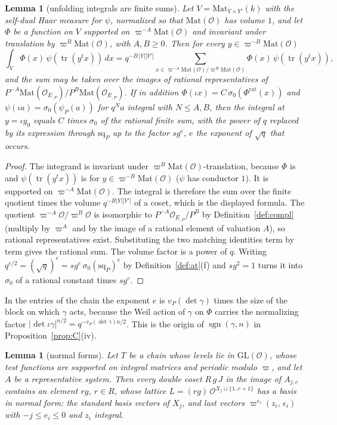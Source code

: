 \documentclass[11pt]{article}
\newcommand{\OEr}{\mathcal O_E}
\newcommand{\Ok}{\mathcal O}
\newcommand{\GL}{\mathrm{GL}}
\newcommand{\Mat}{\mathrm{Mat}}
\newcommand{\sgn}{\operatorname{sgn}}
\newtheorem{lemma}[theorem]{Lemma}
\theoremstyle{definition}
\theoremstyle{remark}
\begin{document}
\begin{lemma}[unfolding integrals are finite sums]\label{lem:C3}
Let $V=\Mat_{Y\times Y'}(k)$ with the self-dual Haar measure for $\psi$, normalized so that $\Mat(\Ok)$ has volume $1$, and let $\Phi$ be a function on $V$ supported on $\varpi^{-A}\Mat(\Ok)$ and invariant under translation by $\varpi^{B}\Mat(\Ok)$, with $A,B\ge0$. Then for every $y\in\varpi^{-B}\Mat(\Ok)$
\[
\int_V\Phi(x)\,\psi(\operatorname{tr}(y^{t}x))\,dx=q^{-B\,|Y||Y'|}\sum_{x\in\varpi^{-A}\Mat(\Ok)/\varpi^{B}\Mat(\Ok)}\Phi(x)\,\psi(\operatorname{tr}(y^{t}x)),
\]
and the sum may be taken over the images of rational representatives of $P^{-A}\Mat(\OEr_{,P})/P^{B}\Mat(\OEr_{,P})$. If in addition $\Phi(\iota x)=C\,\sigma_0(\Phi^{\mathrm{rat}}(x))$ and $\psi(\iota a)=\sigma_0(\psi_P(a))$ for $q^{N}a$ integral with $N\le A,B$, then the integral at $y=\iota y_0$ equals $C$ times $\sigma_0$ of the rational finite sum, with the power of $q$ replaced by its expression through $\mathrm{sq}_P$ up to the factor $sg^{e}$, $e$ the exponent of $\sqrt q$ that occurs.
\end{lemma}

\begin{proof}
The integrand is invariant under $\varpi^{B}\Mat(\Ok)$-translation, because $\Phi$ is and $\psi(\operatorname{tr}(y^{t}x))$ is for $y\in\varpi^{-B}\Mat(\Ok)$ ($\psi$ has conductor $1$). It is supported on $\varpi^{-A}\Mat(\Ok)$. The integral is therefore the sum over the finite quotient times the volume $q^{-B|Y||Y'|}$ of a coset, which is the displayed formula. The quotient $\varpi^{-A}\Ok/\varpi^{B}\Ok$ is isomorphic to $P^{-A}\OEr_{,P}/P^{B}$ by Definition~\ref{def:compl} (multiply by $\varpi^{A}$ and by the image of a rational element of valuation $A$), so rational representatives exist. Substituting the two matching identities term by term gives the rational sum. The volume factor is a power of $q$. Writing $q^{e/2}=(\sqrt q)^{e}=sg^{e}\,\sigma_0(\mathrm{sq}_P)^{e}$ by Definition~\ref{def:at}(f) and $sg^2=1$ turns it into $\sigma_0$ of a rational constant times $sg^{e}$.
\end{proof}

In the entries of the chain the exponent $e$ is $v_P(\det\gamma)$ times the size of the block on which $\gamma$ acts, because the Weil action of $\gamma$ on $\Phi$ carries the normalizing factor $\lvert\det\iota\gamma\rvert^{n/2}=q^{-v_P(\det\gamma)n/2}$. This is the origin of $\sgn(\gamma,n)$ in Proposition~\ref{prop:C}(iv).

\begin{lemma}[normal forms]\label{lem:C4}
Let $T$ be a chain whose levels lie in $\GL(\Ok)$, whose test functions are supported on integral matrices and periodic modulo $\varpi$, and let $A$ be a representative system. Then every double coset $R\,g\,J$ in the image of $A_{j,c}$ contains an element $r g$, $r\in R$, whose lattice $L=(rg)\,\Ok^{X_j\sqcup\{1..c+1\}}$ has a basis in normal form: the standard basis vectors of $X_j$, and last vectors $\varpi^{e_i}(z_i,\,\epsilon_i)$ with $-j\le e_i\le0$ and $z_i$ integral.
\end{lemma}
\end{document}
